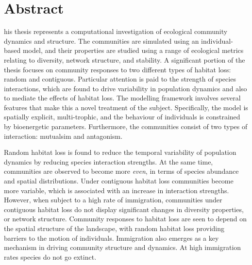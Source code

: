 %
%
%

\chapter*{Abstract}
\begin{SingleSpace}
his thesis represents a computational investigation of ecological community dynamics and structure. The communities are simulated using an individual-based model, and their properties are studied using a range of ecological metrics relating to diversity, network structure, and stability. A significant portion of the thesis focuses on community responses to two different types of habitat loss: random and contiguous. Particular attention is paid to the strength of species interactions, which are found to drive variability in population dynamics and also to mediate the effects of habitat loss. The modelling framework involves several features that make this a novel treatment of the subject. Specifically, the model is spatially explicit, multi-trophic, and the behaviour of individuals is constrained by bioenergetic parameters. Furthermore, the communities consist of two types of interaction: mutualsim and antagonism. 


Random habitat loss is found to reduce the temporal variability of population dynamics by reducing species interaction strengths. At the same time, communities are observed to become more \emph{even}, in terms of species abundance and spatial distributions. Under contiguous habitat loss communities become more variable, which is associated with an increase in interaction strengths. However, when subject to a high rate of immigration, communities under contiguous habitat loss do not display significant changes in diversity properties, or network structure.  Community responses to habitat loss are seen to depend on the spatial structure of the landscape, with random habitat loss providing barriers to the motion of individuals. Immigration also emerges as a key mechanism in driving community structure and dynamics. At high immigration rates species do not go extinct.


\end{SingleSpace}
